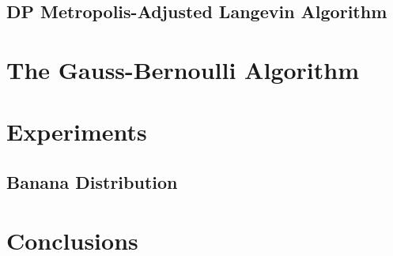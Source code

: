 \documentclass[english,twoside,openright]{HYgraduMLDS}
\begin{document}
\section{DP Metropolis-Adjusted Langevin Algorithm}

\chapter{The Gauss-Bernoulli Algorithm}

\chapter{Experiments}

\section{Banana Distribution}

\chapter{Conclusions}

\cleardoublepage %



%
%
\end{document}
